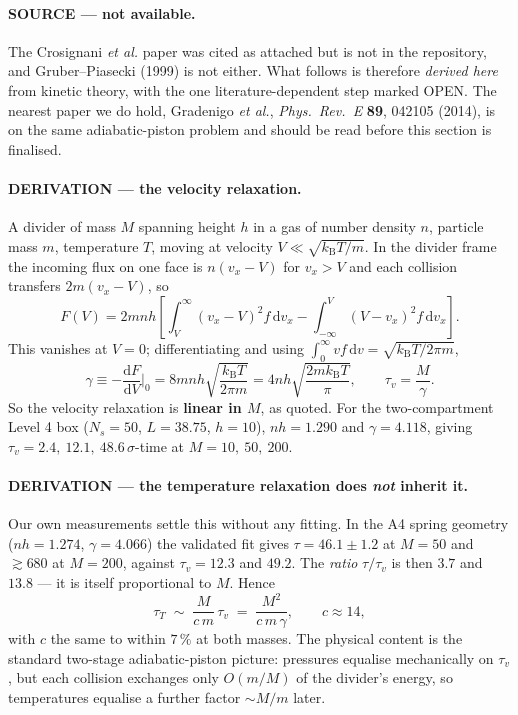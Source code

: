 \documentclass[11pt,a4paper]{article}
\newcommand{\kT}{k_{\mathrm B}T}
\newcommand{\dd}{\mathrm{d}}
\begin{document}
\paragraph{SOURCE --- not available.} The Crosignani \emph{et al.} paper was cited as attached but
is not in the repository, and Gruber--Piasecki (1999) is not either. What follows is therefore
\emph{derived here} from kinetic theory, with the one literature-dependent step marked OPEN. The
nearest paper we do hold, Gradenigo \emph{et al.}, \emph{Phys.\ Rev.\ E} \textbf{89}, 042105 (2014),
is on the same adiabatic-piston problem and should be read before this section is finalised.

\paragraph{DERIVATION --- the velocity relaxation.} A divider of mass $M$ spanning height $h$ in a
gas of number density $n$, particle mass $m$, temperature $T$, moving at velocity $V \ll
\sqrt{\kT/m}$. In the divider frame the incoming flux on one face is $n(v_x - V)$ for $v_x > V$ and
each collision transfers $2m(v_x-V)$, so
\begin{equation}
F(V) = 2mnh\left[\int_V^\infty (v_x-V)^2 f\,\dd v_x - \int_{-\infty}^V (V-v_x)^2 f\,\dd v_x\right].
\end{equation}
This vanishes at $V=0$; differentiating and using $\int_0^\infty v f\,\dd v = \sqrt{\kT/2\pi m}$,
\begin{equation}
\gamma \equiv -\frac{\dd F}{\dd V}\bigg|_0 = 8mnh\sqrt{\frac{\kT}{2\pi m}}
 = 4nh\sqrt{\frac{2m\kT}{\pi}},\qquad \tau_v = \frac{M}{\gamma}.
\label{eq:gamma}
\end{equation}
So the velocity relaxation is \textbf{linear in $M$}, as quoted. For the two-compartment Level 4 box
($N_s = 50$, $L = 38.75$, $h = 10$), $nh = 1.290$ and $\gamma = 4.118$, giving
$\tau_v = 2.4,\ 12.1,\ 48.6\,\sigma$-time at $M = 10,\ 50,\ 200$.

\paragraph{DERIVATION --- the temperature relaxation does \emph{not} inherit it.} Our own
measurements settle this without any fitting. In the A4 spring geometry ($nh = 1.274$,
$\gamma = 4.066$) the validated fit gives $\tau = 46.1 \pm 1.2$ at $M = 50$ and $\gtrsim 680$ at
$M = 200$, against $\tau_v = 12.3$ and $49.2$. The \emph{ratio} $\tau/\tau_v$ is then $3.7$ and
$13.8$ --- it is itself proportional to $M$. Hence
\begin{equation}
\tau_T \;\sim\; \frac{M}{c\,m}\,\tau_v \;=\; \frac{M^2}{c\,m\,\gamma},\qquad c \approx 14 ,
\label{eq:tauT-superseded}
\end{equation}
with $c$ the same to within $7\,\%$ at both masses. The physical content is the standard two-stage
adiabatic-piston picture: pressures equalise mechanically on $\tau_v$, but each collision exchanges
only $O(m/M)$ of the divider's energy, so temperatures equalise a further factor $\sim M/m$ later.
\end{document}
